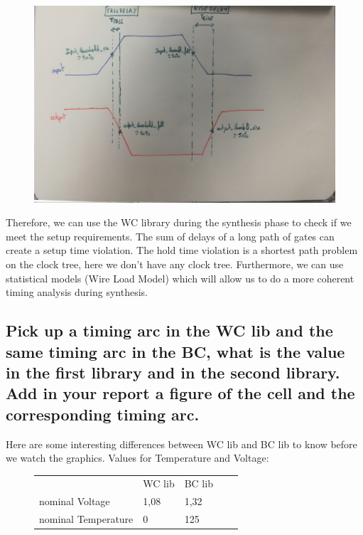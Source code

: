 \documentclass[11pt,a4paper,sans,dvipsnames]{report}
\begin{document}
	\begin{figure}[h!]
		\centering
		\includegraphics[width=0.65\linewidth, frame]{images/delay.jpg}
		\label{fig:delay}
	\end{figure}

	Therefore, we can use the WC library during the synthesis phase to check if we meet the setup requirements. The sum of delays of a long path of gates can create a setup time violation.
	The hold time violation is a shortest path problem on the clock tree, here we don't have any clock tree.
	Furthermore, we can use statistical models (Wire Load Model) which will allow us to do a more coherent timing analysis during synthesis. 

	\newpage
	\subsection*{Pick up a timing arc in the WC lib and the same timing arc in the BC, what is the value in the first library and in the second library. Add in your report a figure of the cell and the corresponding timing arc.}

	Here are some interesting differences between WC lib and BC lib to know before we watch the graphics. Values for Temperature and Voltage:


	\newpage
	\begin{figure}[h!]
		\centering
		\begin{tabular}{lllll}
			\cline{1-3}
			\multicolumn{1}{|l|}{}                    & \multicolumn{1}{l|}{WC lib} & \multicolumn{1}{l|}{BC lib} &  &  \\ \cline{1-3}
			\multicolumn{1}{|l|}{nominal Voltage}     & \multicolumn{1}{l|}{1,08}   & \multicolumn{1}{l|}{1,32}   &  &  \\ \cline{1-3}
			\multicolumn{1}{|l|}{nominal Temperature} & \multicolumn{1}{l|}{0}      & \multicolumn{1}{l|}{125}    &  &  \\ \cline{1-3}
		\end{tabular}
		\label{fig:table}
	\end{figure}%
\end{document}
